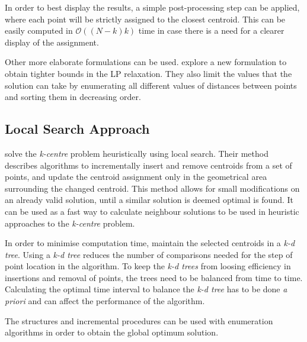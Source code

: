 In order to best display the results, a simple post-processing step can be applied, where each point will be strictly assigned to the closest centroid. This can be easily computed in $\mathcal{O}((N-k)k)$ time in case there is a need for a clearer display of the assignment.

Other more elaborate formulations can be used. \citet{linearprog} explore a new formulation to obtain tighter bounds in the LP relaxation. They also limit the values that the solution can take by enumerating all different values of distances between points and sorting them in decreasing order.

\subsection{Local Search Approach}
\citet{incrementalcov} solve the \emph{k-centre} problem heuristically using local search. Their method describes algorithms to incrementally insert and remove centroids from a set of points, and update the centroid assignment only in the geometrical area surrounding the changed centroid. This method allows for small modifications on an already valid solution, until a similar solution is deemed optimal is found. It can be used as a fast way to calculate neighbour solutions to be used in heuristic approaches to the \emph{k-centre} problem.

In order to minimise computation time, \citet{incrementalcov} maintain the selected centroids in a \emph{k-d tree}. Using a \emph{k-d tree} reduces the number of comparisons needed for the step of point location in the algorithm. To keep the \emph{k-d trees} from loosing efficiency in insertions and removal of points, the trees need to be balanced from time to time. Calculating the optimal time interval to balance the \emph{k-d tree} has to be done \emph{a priori} and can affect the performance of the algorithm.

The structures and incremental procedures can be used with enumeration algorithms in order to obtain the global optimum solution.